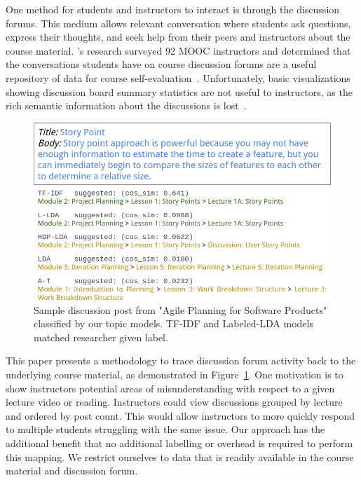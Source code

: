 \documentclass[sigconf, anonymous]{acmart}
\begin{document}
One method for students and instructors to interact is through the discussion forums.
This medium allows relevant conversation where students ask questions, express their thoughts, and seek help from their peers and instructors about the course material.
\citeauthor{stephens2014monitoring}'s research surveyed 92 MOOC instructors and determined that the conversations students have on course discussion forums are a useful repository of data for course self-evaluation~\cite{stephens2014monitoring}.
Unfortunately, basic visualizations showing discussion board summary statistics are not useful to instructors, as the rich semantic information about the discussions is lost~\cite{stephens2014monitoring}.


\begin{figure}
    \centering
    \includegraphics[width=\columnwidth]{fig/sample_classification}
    \caption{Sample discussion post from "Agile Planning for Software Products" classified by our topic models. TF-IDF and Labeled-LDA models matched researcher given label.}
    \label{fig:sample_classification}
\end{figure}

This paper presents a methodology to trace discussion forum activity back to the underlying course material, as demonstrated in Figure~\ref{fig:sample_classification}.
One motivation is to show instructors potential areas of misunderstanding with respect to a given lecture video or reading.
Instructors could view discussions grouped by lecture and ordered by post count.
This would allow instructors to more quickly respond to multiple students struggling with the same issue.
Our approach has the additional benefit that no additional labelling or overhead is required to perform this mapping.
We restrict ourselves to data that is readily available in the course material and discussion forum.
\end{document}
